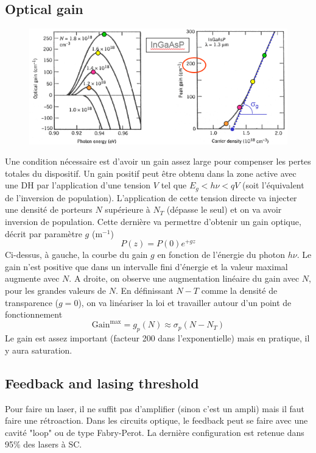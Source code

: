 \subsection{Optical gain}
	\begin{figure}
	\vspace{-5mm}
	\includegraphics[scale=0.65]{ch4/image12}
	\end{figure}
Une condition nécessaire est d'avoir un gain assez large pour compenser les pertes totales du 
dispositif. Un gain positif peut être obtenu dans la zone active avec une DH par l'application d'une
tension $V$ tel que $E_g < h\nu < qV$ (soit l'équivalent de l'inversion de population). L'application
de cette tension directe va injecter une densité de porteurs $N$ supérieure à $N_T$ (dépasse le seul)
et on va avoir inversion de population. Cette dernière va permettre d'obtenir un gain optique, décrit
par paramètre
$g$ (m$^{-1}$)
\begin{equation}
P(z) = P(0)e^{+gz}
\end{equation}
Ci-dessus, à gauche, la courbe du gain $g$ en fonction de l'énergie du photon $h\nu$. Le gain n'est
positive que dans un intervalle fini d'énergie et la valeur maximal augmente avec $N$. A droite, on
observe une augmentation linéaire du gain avec $N$, pour les grandes valeurs de $N$. En définissant
$N-T$ comme la densité de transparence ($g=0$), on va linéariser la loi et travailler autour d'un
point de fonctionnement
\begin{equation}
\text{Gain}^{\text{max}} = g_p(N) \approx \sigma_p(N-N_T)
\end{equation}
Le gain est assez important (facteur 200 dans l'exponentielle) mais en pratique, il y aura saturation.

\subsection{Feedback and lasing threshold}
Pour faire un laser, il ne suffit pas d'amplifier (sinon c'est un ampli) mais il faut faire une
rétroaction. Dans les circuits optique, le feedback peut se faire avec une cavité "loop" ou de type
Fabry-Perot. La dernière configuration est retenue dans 95\% des lasers à SC. \\

